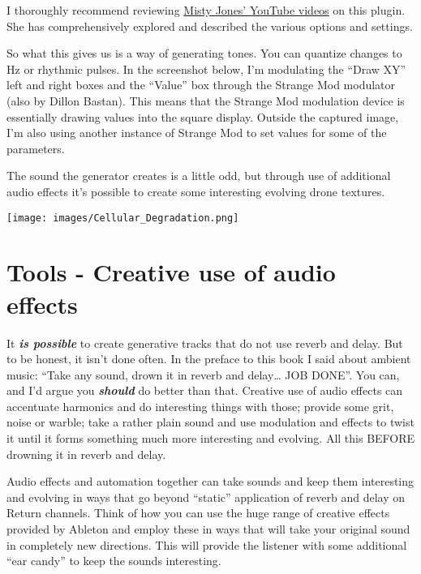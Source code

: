 \documentclass[
  12pt,
  letterpaper,
  oneside,
  open=any]{scrbook}
\begin{document}
I thoroughly recommend reviewing
\href{https://www.youtube.com/watch?v=dM2ksxavJzI}{Misty Jones' YouTube
videos} on this plugin. She has comprehensively explored and described
the various options and settings.

So what this gives us is a way of generating tones. You can quantize
changes to Hz or rhythmic pulses. In the screenshot below, I'm
modulating the ``Draw XY'' left and right boxes and the ``Value'' box
through the Strange Mod modulator (also by Dillon Bastan). This means
that the Strange Mod modulation device is essentially drawing values
into the square display. Outside the captured image, I'm also using
another instance of Strange Mod to set values for some of the
parameters.

The sound the generator creates is a little odd, but through use of
additional audio effects it's possible to create some interesting
evolving drone textures.

\texttt{[image: images/Cellular\_Degradation.png]}


\chapter{Tools - Creative use of audio
effects}\label{Chapter-015-Tools-Audio_Effects}

It \textbf{\emph{is possible}} to create generative tracks that do not
use reverb and delay. But to be honest, it isn't done often. In the
preface to this book I said about ambient music: ``Take any sound, drown
it in reverb and delay\ldots{} JOB DONE''. You can, and I'd argue you
\textbf{\emph{should}} do better than that. Creative use of audio
effects can accentuate harmonics and do interesting things with those;
provide some grit, noise or warble; take a rather plain sound and use
modulation and effects to twist it until it forms something much more
interesting and evolving. All this BEFORE drowning it in reverb and
delay.

\begin{tcolorbox}[enhanced jigsaw, arc=.35mm, title=\textcolor{quarto-callout-tip-color}{\faLightbulb}\hspace{0.5em}{Key idea}, colback=white, opacitybacktitle=0.6, coltitle=black, toptitle=1mm, colframe=quarto-callout-tip-color-frame, bottomtitle=1mm, titlerule=0mm, rightrule=.15mm, bottomrule=.15mm, colbacktitle=quarto-callout-tip-color!10!white, toprule=.15mm, breakable, opacityback=0, left=2mm, leftrule=.75mm]

Audio effects and automation together can take sounds and keep them
interesting and evolving in ways that go beyond ``static'' application
of reverb and delay on Return channels. Think of how you can use the
huge range of creative effects provided by Ableton and employ these in
ways that will take your original sound in completely new directions.
This will provide the listener with some additional ``ear candy'' to
keep the sounds interesting.

\end{tcolorbox}
\end{document}
